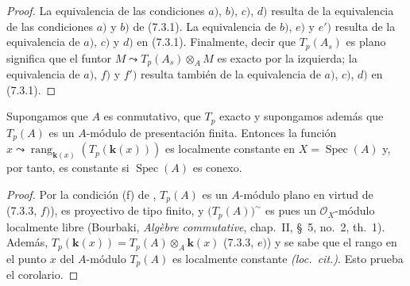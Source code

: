 \begin{proof}
La equivalencia de las condiciones $a)$, $b)$, $c)$, $d)$ resulta de la equivalencia
de las condiciones $a)$ y $b)$ de (7.3.1). La equivalencia de $b)$, $e)$ y $e')$
resulta de la equivalencia de $a)$, $c)$ y $d)$ en (7.3.1). Finalmente, decir que
$T_p(A_s)$
es plano significa que el funtor
$M\leadsto T_p(A_s)\otimes_A M$
es exacto por la izquierda; la equivalencia de $a)$, $f)$ y $f')$ resulta también de
la equivalencia de $a)$, $c)$, $d)$ en (7.3.1).
\end{proof}


\begin{corollary}[7.3.4]
\label{III.7.3.4}
Supongamos que $A$ es conmutativo, que $T_p$ exacto y supongamos además que $T_p(A)$ es un $A$-módulo de presentación finita. Entonces la
función
$x\leadsto\operatorname{rang}_{\mathbf{k}(x)}(T_p(\boldsymbol{k}(x)))$
es localmente constante en $X=\operatorname{Spec}(A)$ y, por tanto, es constante
si $\operatorname{Spec}(A)$ es conexo.
\end{corollary}

\begin{proof}
Por la condición (f) de , $T_p(A)$ es un
$A$-módulo plano en virtud de (7.3.3, $f)$), es
proyectivo de tipo finito, y $\bigl(T_p(A)\bigr)^{\sim}$ es pues un
$\mathscr O_X$-módulo localmente
libre (Bourbaki, \emph{Alg\`ebre commutative}, chap.~II, \S~5,
no.~2, th.~1). Además,
$T_p(\boldsymbol{k}(x))=T_p(A)\otimes_A\boldsymbol{k}(x)$
(7.3.3, $e)$) y se sabe que el rango en el punto $x$ del $A$-módulo $T_p(A)$ es localmente constante
\emph{(loc.\ cit.)}. Esto prueba el corolario.
\end{proof}

